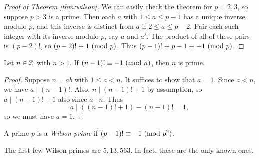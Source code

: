 \begin{proof}[Proof of Theorem \ref{thm:wilson}]
  We can easily check the theorem
  for $p = 2, 3$, so suppose
  $p > 3$ is a prime. Then each $a$
  with $1 \le a \le p - 1$ has a unique
  inverse modulo $p$, and this inverse
  is distinct from $a$ if
  $2 \le a \le p - 2$. Pair each such
  integer with its inverse modulo $p$,
  say $a$ and $a'$. The product of
  all of these pairs is
  $(p - 2)!$, so
  $(p - 2)! \equiv 1 \ (\mathrm{mod}\ p)$.
  Thus $(p - 1)! \equiv p - 1 \equiv -1 \ (\mathrm{mod}\ p)$.
\end{proof}

\begin{prop}
  Let $n \in \mathbb{Z}$ with $n > 1$. If
  $(n - 1)! \equiv -1 \ (\mathrm{mod}\ n)$, then
  $n$ is prime.
\end{prop}

\begin{proof}
  Suppose $n = ab$ with $1 \le a < n$.
  It suffices to show that $a = 1$.
  Since $a < n$, we have
  $a \mid (n - 1)!$. Also,
  $n \mid (n - 1)! + 1$ by assumption,
  so $a \mid (n - 1)! + 1$ also since
  $a \mid n$. Thus
  \[
    a \mid ((n - 1)! + 1) - (n - 1)! = 1,
  \]
  so we must have $a = 1$.
\end{proof}

\begin{definition}
  A prime $p$ is a \emph{Wilson prime}
  if $(p - 1)! \equiv -1 \ (\mathrm{mod}\ p^2)$.
\end{definition}

\begin{example}
  The first few Wilson primes are
  $5, 13, 563$.
  In fact, these are the only known
  ones.
\end{example}
